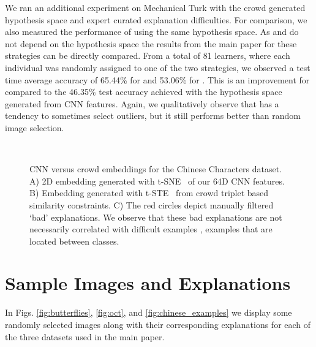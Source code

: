 \documentclass[../main.tex]{subfiles}
\begin{document}
We ran an additional experiment on Mechanical Turk with the crowd generated hypothesis space and expert curated explanation difficulties. 
For comparison, we also measured the performance of \STRICT using the same hypothesis space.
As \RANDIM and \RANDEXP do not depend on the hypothesis space the results from the main paper for these strategies can be directly compared.  
From a total of 81 learners, where each individual was randomly assigned to one of the two strategies, we observed a test time average accuracy of 65.44\% for \EXPLAIN and 53.06\% for \STRICT.
This is an improvement for \EXPLAIN compared to the 46.35\% test accuracy achieved with the hypothesis space generated from CNN features.
Again, we qualitatively observe that \STRICT has a tendency to sometimes select outliers, but it still performs better than random image selection.


\begin{figure*}[h!]
    \centering
    ~
    ~
    \caption{CNN versus crowd embeddings for the Chinese Characters dataset. A) 2D embedding generated with t-SNE~\cite{maaten2008visualizing} of our 64D CNN features. B) Embedding generated with t-STE~\cite{van2012stochastic} from crowd triplet based similarity constraints. C) The red circles depict manually filtered `bad' explanations. We observe that these bad explanations are not necessarily correlated with difficult examples \ie, examples that are located between classes.}
    \label{fig:chinese_embed}
\end{figure*}





%
%
%
\section{Sample Images and Explanations}
In Figs. \ref{fig:butterflies}, \ref{fig:oct}, and \ref{fig:chinese_examples} we display some randomly selected images along with their corresponding explanations for each of the three datasets used in the main paper.
\end{document}
